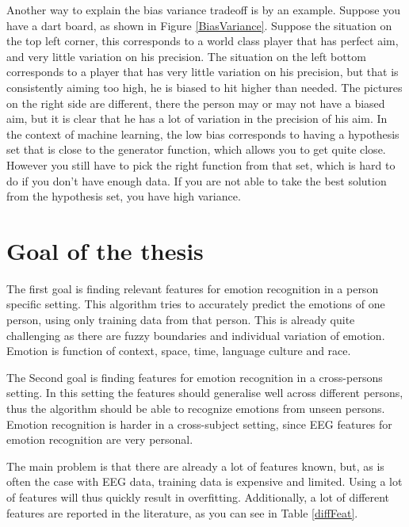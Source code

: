 Another way to explain the bias variance tradeoff is by an example. Suppose you have a dart board, as shown in Figure \ref{BiasVariance}. Suppose the situation on the top left corner, this corresponds to a world class player that has perfect aim, and very little variation on his precision. The situation on the left bottom corresponds to a player that has very little variation on his precision, but that is consistently aiming too high, he is biased to hit higher than needed. The pictures on the right side are different, there the person may or may not have a biased aim, but it is clear that he has a lot of variation in the precision of his aim.
\npar
In the context of machine learning, the low bias corresponds to having a hypothesis set that is close to the generator function, which allows you to get quite close. However you still have to pick the right function from that set, which is hard to do if you don't have enough data. If you are not able to take the best solution from the hypothesis set, you have high variance.


\section{Goal of the thesis}
The first goal is finding relevant features for emotion recognition in a person specific setting. This algorithm tries to accurately predict the emotions of one person, using only training data from that person. This is already quite challenging as there are fuzzy boundaries and individual variation of emotion. Emotion is function of context, space, time, language culture and race. \citep{emorecoghard}

\npar

The Second goal is finding features for emotion recognition in a cross-persons setting. In this setting the features should generalise well across different persons, thus the algorithm should be able to recognize emotions from unseen persons. Emotion recognition is harder in a cross-subject setting, since EEG features for emotion recognition are very personal\citep{DEAP}.

\npar

The main problem is that there are already a lot of features known, but, as is often the case with EEG data, training data is expensive and limited. Using a lot of features will thus quickly result in overfitting. Additionally, a lot of different features are reported in the literature, as you can see in Table \ref{diffFeat}.

